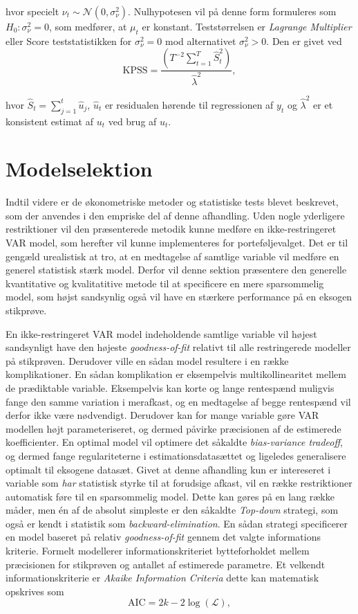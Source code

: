 \documentclass[
  a4paper,
  oneside]{memoir}
\begin{document}
hvor specielt \(\nu_t\sim\mathcal{N}(0,\sigma_\nu ^2)\). Nulhypotesen vil på denne form formuleres som \(H_0:\sigma_\nu^2=0\), som medfører, at \(\mu_t\) er konstant. Teststørrelsen er \emph{Lagrange Multiplier} eller Score teststatistikken for \(\sigma_\nu ^2=0\) mod alternativet \(\sigma_\nu ^2>0\). Den er givet ved
\[\text{KPSS}=\frac{(T^{-2} \sum_{t=1}^T \hat{S}_t^2)}{\hat{\lambda}^2},\]

hvor \(\hat{S}_t=\sum_{j=1}^t \hat{u}_j\), \(\hat{u}_t\) er residualen hørende til regressionen af \(y_t\) og \(\hat{\lambda}^2\) er et konsistent estimat af \(u_t\) ved brug af \(\hat{u}_t\).

\hypertarget{sekmodelselek}{%
\section{Modelselektion}\label{sekmodelselek}}

Indtil videre er de økonometriske metoder og statistiske tests blevet beskrevet, som der anvendes i den empriske del af denne afhandling. Uden nogle yderligere restriktioner vil den præsenterede metodik kunne medføre en ikke-restringeret VAR model, som herefter vil kunne implementeres for porteføljevalget. Det er til gengæld urealistisk at tro, at en medtagelse af samtlige variable vil medføre en generel statistisk stærk model. Derfor vil denne sektion præsentere den generelle kvantitative og kvalitatitive metode til at specificere en mere sparsommelig model, som højst sandsynlig også vil have en stærkere performance på en eksogen stikprøve.

En ikke-restringeret VAR model indeholdende samtlige variable vil højest sandsynligt have den højeste \emph{goodness-of-fit} relativt til alle restringerede modeller på stikprøven. Derudover ville en sådan model resultere i en række komplikationer. En sådan komplikation er eksempelvis multikollinearitet mellem de prædiktable variable. Eksempelvis kan korte og lange rentespænd muligvis fange den samme variation i merafkast, og en medtagelse af begge rentespænd vil derfor ikke være nødvendigt. Derudover kan for mange variable gøre VAR modellen højt parameteriseret, og dermed påvirke præcisionen af de estimerede koefficienter. En optimal model vil optimere det såkaldte \emph{bias-variance tradeoff}, og dermed fange regulariteterne i estimationsdatasættet og ligeledes generalisere optimalt til eksogene datasæt. Givet at denne afhandling kun er intereseret i variable som \emph{har} statistisk styrke til at forudsige afkast, vil en række restriktioner automatisk føre til en sparsommelig model. Dette kan gøres på en lang række måder, men én af de absolut simpleste er den såkaldte \emph{Top-down} strategi, som også er kendt i statistik som \emph{backward-elimination}. En sådan strategi specificerer en model baseret på relativ \emph{goodness-of-fit} gennem det valgte informations kriterie. Formelt modellerer informationskriteriet bytteforholdet mellem præcisionen for stikprøven og antallet af estimerede parametre. Et velkendt informationskriterie er \emph{Akaike Information Criteria} dette kan matematisk opskrives som
\[\text{AIC}=2k-2\log(\mathcal{L}),\]
\end{document}
